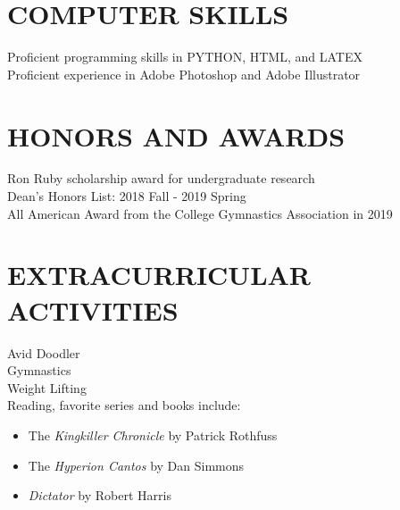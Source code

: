 \documentclass{res}
\begin{document}
\begin{resume}
\section{COMPUTER SKILLS}                  
    Proficient programming skills in PYTHON, HTML, and LATEX\\
    Proficient experience in Adobe Photoshop and Adobe Illustrator           
 
 
 
\section{HONORS AND AWARDS}        
	Ron Ruby scholarship award for undergraduate research\\
	Dean's Honors List: 2018 Fall - 2019 Spring\\
	All American Award from the College Gymnastics Association in 2019\\
	
	
 
\section{EXTRACURRICULAR ACTIVITIES}          
    Avid Doodler\\
    Gymnastics\\
    Weight Lifting\\
    Reading, favorite series and books include:
    \begin{itemize}
    \item The \textit{Kingkiller Chronicle} by Patrick Rothfuss
    \item The \textit{Hyperion Cantos} by Dan Simmons
    \item \textit{Dictator} by Robert Harris
    \end{itemize}
    
\end{resume}
\end{document}
